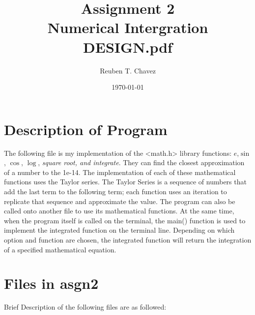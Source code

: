\documentclass[11pt]{article} %
\title{Assignment 2 \\
    \large Numerical Intergration \\
    \textbf{ DESIGN.pdf}}
\author{Reuben T. Chavez}
\date{\today} %
\begin{document}
\maketitle %

\pagebreak
\section*{Description of Program}
\begin{flushleft}
The following file is my implementation of the <math.h> library functions: \(e\),\(\sin\), \(\cos\), 
\(\log\), \emph{square root, and integrate}. They can find the closest approximation of a number to the 1e-14.
The implementation of each of these mathematical functions uses the Taylor series. The Taylor Series 
is a sequence of numbers that add the last term to the following term; each function uses an 
iteration to replicate that sequence and approximate the value. The program can also be called onto 
another file to use its mathematical functions. At the same time, when the program itself is 
called on the terminal, the main() function is used to implement the integrated function on the 
terminal line. Depending on which option and function are chosen, the integrated function will 
return the integration of a specified mathematical equation.
\end{flushleft}

\pagebreak
\section*{Files in asgn2} 

Brief Description of the following files are as followed:
\end{document}
